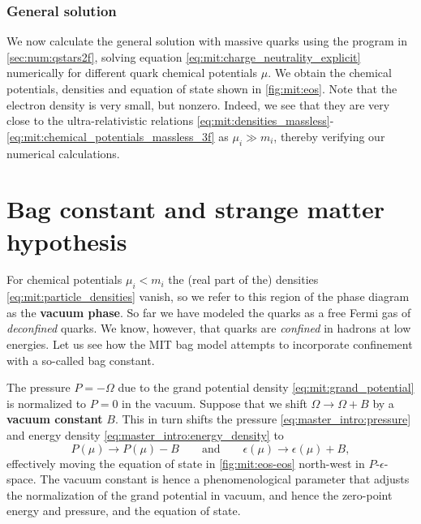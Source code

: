 \subsubsection{General solution}

We now calculate the general solution with massive quarks using the program in \cref{sec:num:qstars2f},
solving equation \eqref{eq:mit:charge_neutrality_explicit} numerically for different quark chemical potentials $\mu$.
We obtain the chemical potentials, densities and equation of state shown in \cref{fig:mit:eos}.
Note that the electron density is very small, but nonzero.
Indeed, we see that they are very close to the ultra-relativistic relations
\eqref{eq:mit:densities_massless}-\eqref{eq:mit:chemical_potentials_massless_3f}
as $\mu_i \gg m_i$, thereby verifying our numerical calculations.


\section{Bag constant and strange matter hypothesis}

For chemical potentials $\mu_i < m_i$ the (real part of the) densities \eqref{eq:mit:particle_densities} vanish,
so we refer to this region of the phase diagram as the \textbf{vacuum phase}.
So far we have modeled the quarks as a free Fermi gas of \emph{deconfined} quarks.
We know, however, that quarks are \emph{confined} in hadrons at low energies.
Let us see how the MIT bag model attempts to incorporate confinement with a so-called bag constant.

The pressure $P = -\Omega$ due to the grand potential density \eqref{eq:mit:grand_potential} is normalized to $P = 0$ in the vacuum.
Suppose that we shift $\Omega \rightarrow \Omega + B$ by a \textbf{vacuum constant} $B$.
This in turn shifts the pressure \eqref{eq:master_intro:pressure} and energy density \eqref{eq:master_intro:energy_density} to
\begin{equation}
	P(\mu) \rightarrow P(\mu) - B
	\qquad \text{and} \qquad
	\epsilon(\mu) \rightarrow \epsilon(\mu) + B,
\label{eq:mit:bag_shift}
\end{equation}
effectively moving the equation of state in \cref{fig:mit:eos-eos} north-west in $P$-$\epsilon$-space.
The vacuum constant is hence a phenomenological parameter
that adjusts the normalization of the grand potential in vacuum,
and hence the zero-point energy and pressure, and the equation of state.

